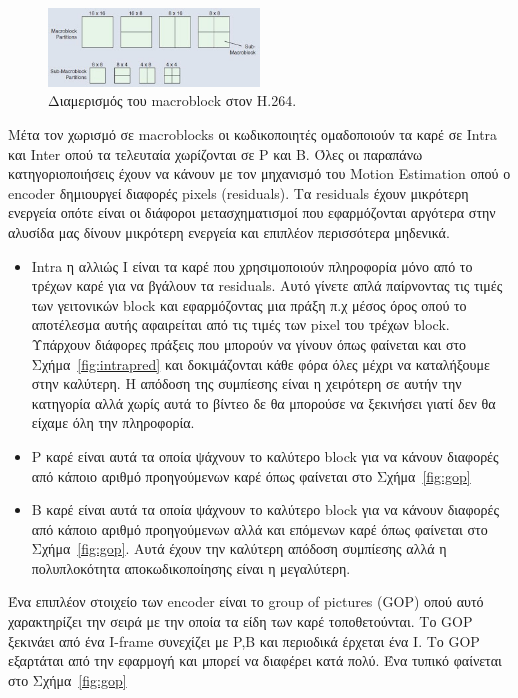 \begin{figure}[h!]

  \centering
    \includegraphics[width=0.5\textwidth]{chapter2/mbpart.jpg}
  \caption{Διαμερισμός του macroblock στον H.264.}
  \label{fig:mbpart}
\end{figure}

\indent Μέτα τον χωρισμό σε macroblocks οι κωδικοποιητές ομαδοποιούν τα καρέ σε Intra και Inter οπού τα τελευταία χωρίζονται σε P και Β. Όλες οι παραπάνω κατηγοριοποιήσεις έχουν να κάνουν με τον μηχανισμό του Motion Estimation οπού ο encoder δημιουργεί διαφορές pixels (residuals). Τα residuals έχουν μικρότερη ενεργεία οπότε είναι οι διάφοροι μετασχηματισμοί που εφαρμόζονται αργότερα στην αλυσίδα μας δίνουν μικρότερη ενεργεία και επιπλέον περισσότερα μηδενικά.

\begin{itemize}
  \item Intra η αλλιώς I είναι τα καρέ που χρησιμοποιούν πληροφορία μόνο από το τρέχων καρέ για να βγάλουν τα residuals. Αυτό γίνετε απλά παίρνοντας τις τιμές των γειτονικών block και εφαρμόζοντας μια πράξη π.χ μέσος όρος οπού το αποτέλεσμα αυτής αφαιρείται από τις τιμές των pixel του τρέχων block. Υπάρχουν διάφορες πράξεις που μπορούν να γίνουν όπως φαίνεται και στο Σχήμα~\ref{fig:intrapred} και δοκιμάζονται κάθε φόρα όλες μέχρι να καταλήξουμε στην καλύτερη. Η απόδοση της συμπίεσης είναι η χειρότερη σε αυτήν την κατηγορία αλλά χωρίς αυτά το βίντεο δε θα μπορούσε να ξεκινήσει γιατί δεν θα είχαμε όλη την πληροφορία.

  \item P καρέ είναι αυτά τα οποία ψάχνουν το καλύτερο block για να κάνουν διαφορές από κάποιο αριθμό προηγούμενων καρέ όπως φαίνεται στο Σχήμα~\ref{fig:gop}

  \item Β καρέ είναι αυτά τα οποία ψάχνουν το καλύτερο block για να κάνουν διαφορές από κάποιο αριθμό προηγούμενων αλλά και επόμενων καρέ όπως φαίνεται στο Σχήμα~\ref{fig:gop}. Αυτά έχουν την καλύτερη απόδοση συμπίεσης αλλά η πολυπλοκότητα αποκωδικοποίησης είναι η μεγαλύτερη.
\end{itemize}

\indent Ένα επιπλέον στοιχείο των encoder είναι το group of pictures (GOP) οπού αυτό χαρακτηρίζει την σειρά με την οποία τα είδη των καρέ τοποθετούνται. Το GOP ξεκινάει από ένα I-frame συνεχίζει με P,B και περιοδικά έρχεται ένα Ι. Το GOP εξαρτάται από την εφαρμογή και μπορεί να διαφέρει κατά πολύ. Ένα τυπικό φαίνεται στο Σχήμα~\ref{fig:gop}

